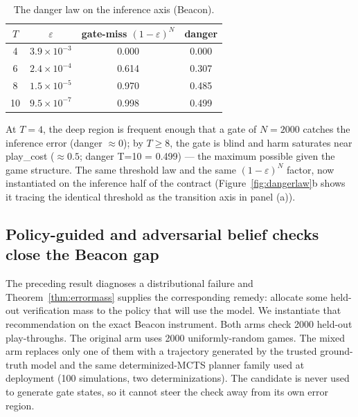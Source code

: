 \documentclass[11pt]{article}
\theoremstyle{remark}
\begin{document}
\begin{table}[ht]
\centering
\small
\begin{tabular}{cccc}
\toprule
$T$ & $\varepsilon$ & gate-miss $(1-\varepsilon)^N$ & danger \\
\midrule
4  & $3.9\times 10^{-3}$ & 0.000 & 0.000 \\
6  & $2.4\times 10^{-4}$ & 0.614 & 0.307 \\
8  & $1.5\times 10^{-5}$ & 0.970 & 0.485 \\
10 & $9.5\times 10^{-7}$ & 0.998 & 0.499 \\
\bottomrule
\end{tabular}
\caption{The danger law on the inference axis (Beacon).}
\label{tab:inferenceaxis}
\end{table}

At $T=4$, the deep region is frequent enough that a gate of $N=2000$ catches the inference error (danger $\approx 0$); by $T \geq 8$, the gate is blind and harm saturates near play\_cost ($\approx 0.5$; danger T=10 = 0.499) --- the maximum possible given the game structure. The same threshold law and the same $(1-\varepsilon)^N$ factor, now instantiated on the inference half of the contract (Figure~\ref{fig:dangerlaw}b shows it tracing the identical threshold as the transition axis in panel (a)).

\subsection{Policy-guided and adversarial belief checks close the Beacon gap}
\label{sec:adversarial-belief-gate}

The preceding result diagnoses a distributional failure and Theorem~\ref{thm:errormass} supplies the corresponding remedy: allocate some held-out verification mass to the policy that will use the model. We instantiate that recommendation on the exact Beacon instrument. Both arms check 2000 held-out play-throughs. The original arm uses 2000 uniformly-random games. The mixed arm replaces only one of them with a trajectory generated by the trusted ground-truth model and the same determinized-MCTS planner family used at deployment (100 simulations, two determinizations). The candidate is never used to generate gate states, so it cannot steer the check away from its own error region.
\end{document}
